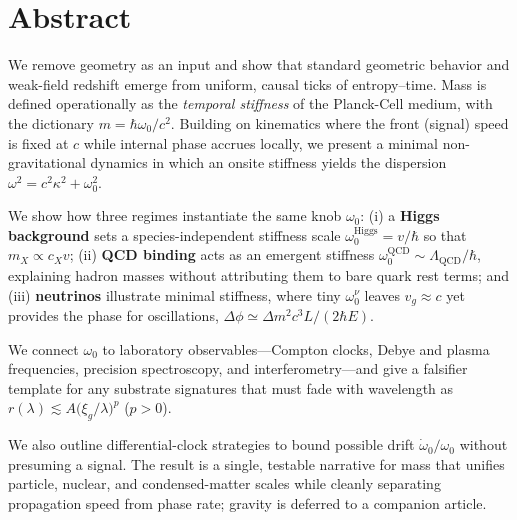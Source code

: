 \section*{Abstract}
We remove geometry as an input and show that standard geometric behavior and weak-field redshift emerge from uniform, causal ticks of entropy--time.
Mass is defined operationally as the \emph{temporal stiffness} of the Planck-Cell medium, with the dictionary \(m=\hbar\omega_0/c^2\). Building on kinematics where the front (signal) speed is fixed at \(c\) while internal phase accrues locally, we present a minimal non-gravitational dynamics in which an onsite stiffness yields the dispersion \(\omega^2=c^2\kappa^2+\omega_0^2\).

We show how three regimes instantiate the same knob \(\omega_0\): (i) a \textbf{Higgs background} sets a species-independent stiffness scale \(\omega_0^{\mathrm{Higgs}}=v/\hbar\) so that \(m_X\propto c_X v\); (ii) \textbf{QCD binding} acts as an emergent stiffness \(\omega_0^{\mathrm{QCD}}\sim \Lambda_{\mathrm{QCD}}/\hbar\), explaining hadron masses without attributing them to bare quark rest terms; and (iii) \textbf{neutrinos} illustrate minimal stiffness, where tiny \(\omega_0^\nu\) leaves \(v_g\approx c\) yet provides the phase for oscillations, \(\Delta\phi\simeq \Delta m^2 c^3 L/(2\hbar E)\).

We connect \(\omega_0\) to laboratory observables—Compton clocks, Debye and plasma frequencies, precision spectroscopy, and interferometry—and give a falsifier template for any substrate signatures that must fade with wavelength as \(r(\lambda)\lesssim A\big(\xi_g/\lambda\big)^{p}\) (\(p>0\)).

We also outline differential-clock strategies to bound possible drift \(\dot{\omega}_0/\omega_0\) without presuming a signal. The result is a single, testable narrative for mass that unifies particle, nuclear, and condensed-matter scales while cleanly separating propagation speed from phase rate; gravity is deferred to a companion article.